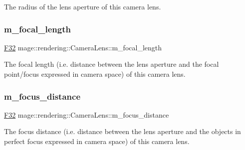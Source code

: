 The radius of the lens aperture of this camera lens. \mbox{\label{classmage_1_1rendering_1_1_camera_lens_a3459fd7d208a7ad8f1cf01718e008e36}} 
\subsubsection{\texorpdfstring{m\+\_\+focal\+\_\+length}{m\_focal\_length}}
{\footnotesize\ttfamily \mbox{\hyperlink{namespacemage_aa97e833b45f06d60a0a9c4fc22ae02c0}{F32}} mage\+::rendering\+::\+Camera\+Lens\+::m\+\_\+focal\+\_\+length\hspace{0.3cm}{\ttfamily [private]}}

The focal length (i.\+e. distance between the lens aperture and the focal point/focus expressed in camera space) of this camera lens. \mbox{\label{classmage_1_1rendering_1_1_camera_lens_a3d2da4f61425500a51171b19e4a03769}} 
\subsubsection{\texorpdfstring{m\+\_\+focus\+\_\+distance}{m\_focus\_distance}}
{\footnotesize\ttfamily \mbox{\hyperlink{namespacemage_aa97e833b45f06d60a0a9c4fc22ae02c0}{F32}} mage\+::rendering\+::\+Camera\+Lens\+::m\+\_\+focus\+\_\+distance\hspace{0.3cm}{\ttfamily [private]}}

The focus distance (i.\+e. distance between the lens aperture and the objects in perfect focus expressed in camera space) of this camera lens. 